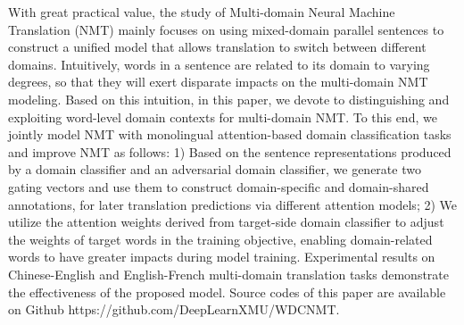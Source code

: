 With great practical value, the study of Multi-domain Neural Machine Translation (NMT) mainly focuses on using mixed-domain parallel sentences to construct a unified model that allows translation to switch between different domains. Intuitively, words in a sentence are related to its domain to varying degrees, so that they will exert disparate impacts on the multi-domain NMT modeling. Based on this intuition, in this paper, we devote to distinguishing and exploiting word-level domain contexts for multi-domain NMT. To this end, we jointly model NMT with monolingual attention-based domain classification tasks and improve NMT as follows: 1) Based on the sentence representations produced by a domain classifier and an adversarial domain classifier, we generate two gating vectors and use them to construct domain-specific and domain-shared annotations, for later translation predictions via different attention models; 2) We utilize the attention weights derived from target-side domain classifier to adjust the weights of target words in the training objective, enabling domain-related words to have greater impacts during model training. Experimental results on Chinese-English and English-French multi-domain translation tasks demonstrate the effectiveness of the proposed model. Source codes of this paper are available on Github https://github.com/DeepLearnXMU/WDCNMT.
